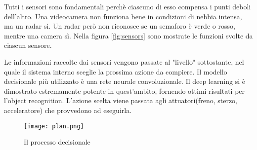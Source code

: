 Tutti i sensori sono fondamentali perchè ciascuno di esso compensa i punti deboli dell'altro. Una videocamera non funziona bene in condizioni di nebbia intensa, ma un radar sì. Un radar però non riconosce se
un semaforo è verde o rosso, mentre una camera sì. Nella figura \ref{fig:sensors} sono mostrate le funzioni svolte da ciascun sensore.


Le informazioni raccolte dai sensori vengono passate al "livello" sottostante, nel quale il sistema interno sceglie la prossima azione da compiere.
Il modello decisionale più utilizzato è una rete neurale convoluzionale. Il deep learning si è dimostrato estremamente potente in quest'ambito, fornendo
ottimi risultati per l'object recognition. L'azione scelta viene passata agli attuatori(freno, sterzo, acceleratore) che provvedono ad eseguirla.
\begin{figure}[h]
    \texttt{[image: plan.png]}
    \caption{Il processo decisionale\cite{giacaglia}}
    \label{fig:giacaglia}
\end{figure}